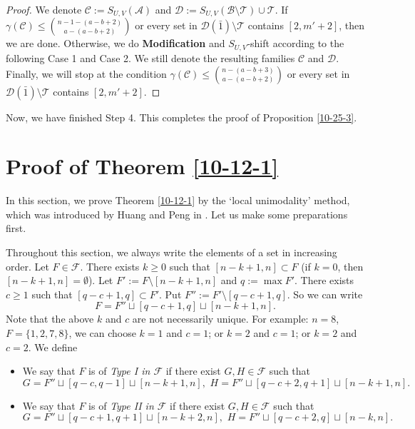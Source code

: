 \documentclass[11pt]{article}
\newcommand{\m}{\mathcal}
\begin{document}
\begin{proof}
We denote $\m C:=S_{U,V}(\m A)$ and $\m D:=S_{U,V}(\m B\setminus \m T)\cup \m T$.
If $\gamma(\m C)\le {n-1-(a-b+2)\choose a-(a-b+2)}$ or every set in $\m D(\bar1)\setminus \m T$ contains $[2,m'+2]$, then we are done. 
Otherwise, we do {\bf Modification} and $S_{U,V}$-shift according to the following Case 1 and Case 2. 
We still denote the resulting families $\m C$ and $\m D$. 
Finally, we will stop at the condition $\gamma(\m C)\le {n-(a-b+3)\choose a-(a-b+2)}$ or every set in $\m D(\bar1)\setminus \m T$ contains $[2,m'+2]$.
\end{proof}

Now, we have finished Step 4. This completes the proof of Proposition \ref{10-25-3}.
\fi



\section{Proof of Theorem \ref{10-12-1}}
In this section, we prove Theorem \ref{10-12-1} by the `local unimodality' method, which was introduced by Huang and Peng in \cite{12-3-1}. Let us make some preparations first.

Throughout this section, we always write the elements of a set in increasing order.
Let $F\in \m F$. 
There exists $k\ge 0$ such that $[n-k+1,n]\subset F$ (if $k=0$, then $[n-k+1,n]=\emptyset$).
Let $F':=F\setminus [n-k+1,n]$ and $q:=\max F'$.
There exists $c\ge 1$ such that $[q-c+1,q]\subset F'$.
Put $F'':=F'\setminus [q-c+1,q]$. So we can write 
\begin{equation}
F=F''\sqcup[q-c+1,q]\sqcup[n-k+1,n].    
\end{equation}
Note that the above $k$ and $c$ are not necessarily unique. 
For example: $n=8$, $F=\{1,2,7,8\}$, we can choose $k=1$ and $c=1$; or $k=2$ and $c=1$; or $k=2$ and $c=2$.
We define
\begin{itemize}
    \item[Type I.] We say that $F$ is of {\it Type I in $\m F$} if there exist $G, H \in \m F$ such that 
    \begin{equation}\label{writegh1}
    G=F''\sqcup[q-c,q-1]\sqcup[n-k+1,n], \,\, H=F''\sqcup[q-c+2,q+1]\sqcup[n-k+1,n].
    \end{equation}
    \item[Type II.] We say that $F$ is of {\it Type II in $\m F$} if there exist $G, H \in \m F$ such that 
    \begin{equation}\label{writegh2}
    G=F''\sqcup[q-c+1,q+1]\sqcup[n-k+2,n], \,\, H=F''\sqcup[q-c+2,q]\sqcup[n-k,n].
     \end{equation}
\end{itemize}
\end{document}
